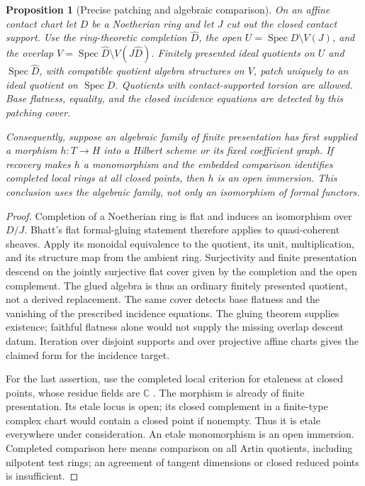 \documentclass[11pt,reqno]{amsart}
\numberwithin{equation}{section}
\newtheorem{proposition}[theorem]{Proposition}
\theoremstyle{definition}\newtheorem{definition}[theorem]{Definition}
\theoremstyle{remark}\newtheorem{remark}[theorem]{Remark}
\newcommand{\C}{\mathbb C}\newcommand{\Q}{\mathbb Q}
\begin{document}
\begin{proposition}[Precise patching and algebraic comparison]
\label{prop:patching-algebraic-v166}
On an affine contact chart let $D$ be a Noetherian ring and let $J$
cut out the closed contact support. Use the ring-theoretic completion
$\widehat D$, the open $U=\operatorname{Spec}D\setminus V(J)$,
and the overlap
$V=\operatorname{Spec}\widehat D\setminus V(J\widehat D)$.
Finitely presented ideal quotients on $U$ and
$\operatorname{Spec}\widehat D$, with compatible quotient algebra
structures on $V$, patch uniquely to an ideal quotient on
$\operatorname{Spec}D$. Quotients with contact-supported torsion
are allowed. Base flatness, equality, and the closed incidence
equations are detected by this patching cover.

Consequently, suppose an algebraic family of finite presentation
has first supplied a morphism $h:T\to H$ into a Hilbert scheme or
its fixed coefficient graph. If recovery makes $h$ a monomorphism
and the embedded comparison identifies completed local rings at
all closed points, then $h$ is an open immersion. This conclusion
uses the algebraic family, not only an isomorphism of formal functors.
\end{proposition}
\begin{proof}
Completion of a Noetherian ring is flat and induces an isomorphism
over $D/J$. Bhatt's flat formal-gluing statement
\cite[Proposition 5.6(4), Example 5.8]{Bhatt163} therefore applies
to quasi-coherent sheaves. Apply its monoidal equivalence to the
quotient, its unit, multiplication, and its structure map from the
ambient ring. Surjectivity and finite presentation descend on the
jointly surjective flat cover given by the completion and the open
complement. The glued algebra is thus an ordinary finitely presented
quotient, not a derived replacement. The same cover detects base
flatness and the vanishing of the prescribed incidence equations.
The gluing theorem supplies existence; faithful flatness alone
would not supply the missing overlap descent datum. Iteration over
disjoint supports and over projective affine charts gives the
claimed form for the incidence target.

For the last assertion, use the completed local criterion for
etaleness at closed points, whose residue fields are $\C$
\cite[Lemma 41.11.3]{Stacks163}. The morphism is already of finite
presentation. Its etale locus is open; its closed complement in a
finite-type complex chart would contain a closed point if nonempty.
Thus it is etale everywhere under consideration. An etale
monomorphism is an open immersion. Completed comparison here means
comparison on all Artin quotients, including nilpotent test rings;
an agreement of tangent dimensions or closed reduced points is
insufficient.
\end{proof}
\end{document}
